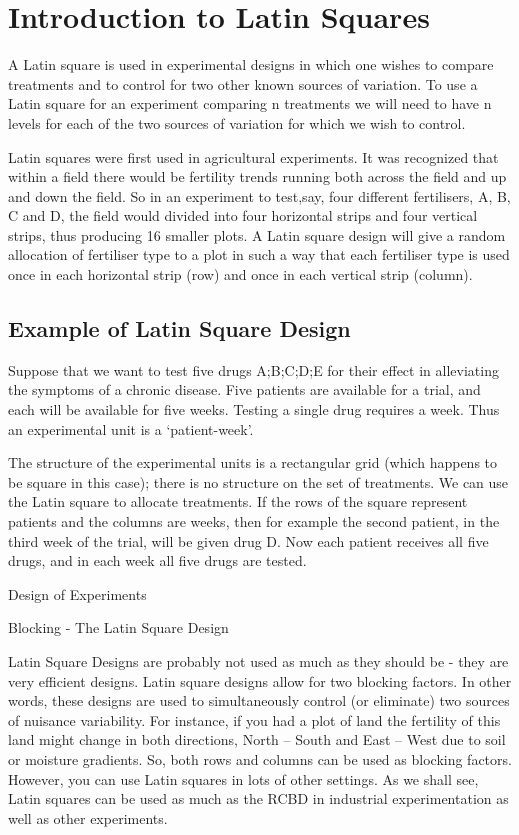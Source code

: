 \documentclass[]{article}
\begin{document}
\newpage

\section{Introduction to Latin Squares}

A Latin square is used in experimental designs in which one wishes to compare treatments and to control for two other known sources of variation. To use a Latin square for an experiment comparing n treatments we will need to have n levels for each of the two sources of variation for which we wish to control.


Latin squares were first used in agricultural experiments. It was recognized that within a field there would be fertility trends running both across the field and up and down the field. So in an experiment to test,say, four different fertilisers, A, B, C and D, the field would divided into four horizontal strips and four vertical strips, thus producing 16 smaller plots. A Latin square design will give a random allocation of fertiliser type to a plot in such a way that each fertiliser type is used once in each horizontal strip (row) and once in each vertical strip (column).


\subsection{Example of Latin Square Design}


Suppose that we want to test five drugs A;B;C;D;E for their effect in alleviating the symptoms of a chronic disease. Five patients are available for a trial, and each will be available for five weeks. Testing a single drug requires a week. Thus an experimental unit is a ‘patient-week’.


The structure of the experimental units is a rectangular grid (which happens to be square in this case); there is no structure on the set of treatments. We can use the Latin square to allocate treatments. If the rows of the square represent patients and the columns are weeks, then for example the second patient, in the third week of the trial, will be given drug D. Now each patient receives all five drugs, and in each week all five drugs are tested.


Design of Experiments

Blocking - The Latin Square Design


Latin Square Designs are probably not used as much as they should be - they are very efficient designs. Latin square designs allow for two blocking factors. In other words, these designs are used to simultaneously control (or eliminate) two sources of nuisance variability. For instance, if you had a plot of land the fertility of this land might change in both directions, North -- South and East -- West due to soil or moisture gradients. So, both rows and columns can be used as blocking factors. However, you can use Latin squares in lots of other settings. As we shall see, Latin squares can be used as much as the RCBD in industrial experimentation as well as other experiments.
\end{document}
